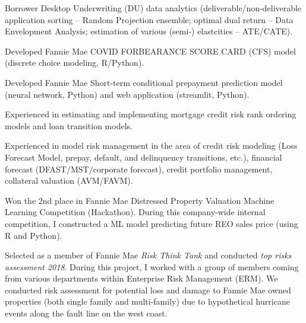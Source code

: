 \documentclass[letterpaper]{article}
\renewenvironment{itemize}{
  \begin{list}{}{
    \setlength{\leftmargin}{1.5em}
  }
}{
  \end{list}
}
\begin{document}
\begin{itemize}

  
  \item[$-$] {\normalsize Borrower Desktop Underwriting (DU) data analytics (deliverable/non-deliverable application sorting -- Random Projection ensemble; optimal dual return -- Data Envelopment Analysis; estimation of various (semi-) elastcities -- ATE/CATE).}
  
  \item[$-$] {\normalsize Developed Fannie Mae COVID FORBEARANCE SCORE CARD (CFS) model (discrete choice modeling, R/Python).}
  
  \item[$-$] {\normalsize Developed Fannie Mae Short-term conditional prepayment prediction model (neural network, Python) and web application (streamlit, Python).}
  
  \item[$-$] {\normalsize Experienced in estimating and implementing mortgage credit risk rank ordering models and loan transition models.}
  
  \item[$-$] {\normalsize Experienced in model risk management in the area of credit risk modeling (Loss Forecast Model, prepay, default, and delinquency transitions, etc.), financial forecast (DFAST/MST/corporate forecast), credit portfolio management, collateral valuation (AVM/FAVM).}
   
  \item[$-$] {\normalsize Won the 2nd place in Fannie Mae Distressed Property Valuation Machine Learning Competition (Hackathon). During this company-wide internal competition, I constructed a ML model predicting future REO sales price (using R and Python).}
  
  \item[$-$] {\normalsize Selected as a member of Fannie Mae {\slshape Risk Think Tank} and conducted {\slshape top risks assessment 2018}. During this project, I worked with a group of members coming from various departments within Enterprise Risk Management (ERM). We conducted risk assessment for potential loss and damage to Fannie Mae owned properties (both single family and multi-family) due to hypothetical hurricane events along the fault line on the west coast.}

\end{itemize}

\vspace{0.2in}
\end{document}
